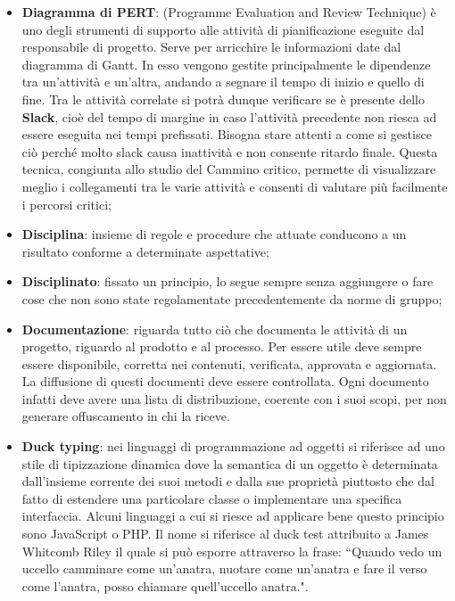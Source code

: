 \begin{itemize}
	\item \textbf {Diagramma di PERT}: (Programme Evaluation and Review Technique) è uno degli strumenti di supporto alle attività di pianificazione eseguite dal responsabile di progetto. \newline
Serve per arricchire le informazioni date dal diagramma di Gantt. In esso vengono gestite principalmente le dipendenze tra un'attività e un'altra, andando a segnare il tempo di inizio e quello di fine. Tra le attività correlate si potrà dunque verificare se è presente dello \textbf{Slack}, cioè del tempo di margine in caso l'attività precedente non riesca ad essere eseguita nei tempi prefissati. Bisogna stare attenti a come si gestisce ciò perché molto slack causa inattività e non consente ritardo finale.   \newline
Questa tecnica, congiunta allo studio del Cammino critico, permette di visualizzare meglio i collegamenti tra le varie attività e consenti di valutare più facilmente i percorsi critici;

	\item \textbf{Disciplina}: insieme di regole e procedure che attuate conducono a un risultato conforme a determinate aspettative;
	\item \textbf{Disciplinato}: fissato un principio, lo segue sempre senza aggiungere o fare cose che non sono state regolamentate precedentemente da norme di gruppo;
	\item \textbf{Documentazione}: riguarda tutto ciò che documenta le attività di un progetto, riguardo al prodotto e al processo.
	Per essere utile deve sempre essere disponibile, corretta nei contenuti, verificata, approvata e aggiornata. La diffusione di questi documenti deve essere controllata. Ogni documento infatti deve avere una lista di distribuzione, coerente con i suoi scopi, per non generare offuscamento in chi la riceve.
	\item \textbf{Duck typing}: nei linguaggi di programmazione ad oggetti si riferisce ad uno stile di tipizzazione dinamica dove la semantica di un oggetto è determinata dall'insieme corrente dei suoi metodi e dalla sue proprietà piuttosto che dal fatto di estendere una particolare classe o implementare una specifica interfaccia. \newline
Alcuni linguaggi a cui si riesce ad applicare bene questo principio sono JavaScript o PHP.
Il nome si riferisce al duck test attribuito a James Whitcomb Riley il quale si può esporre attraverso la frase: ``Quando vedo un uccello camminare come un'anatra, nuotare come un'anatra e fare il verso come l'anatra, posso chiamare quell'uccello anatra.".

\end{itemize}
